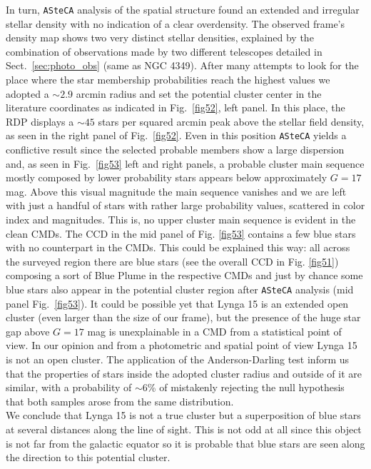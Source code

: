\documentclass[draft]{aa}
\begin{document}
In turn, \texttt{ASteCA} analysis of the spatial structure found an extended and
irregular stellar density with no indication of a clear overdensity.
The observed frame's density map shows two very distinct stellar
densities, explained by the combination of observations made by two different
telescopes detailed in Sect.~\ref{sec:photo_obs} (same as NGC 4349).
%
After many attempts to look for the place where the star membership
probabilities reach the highest values we adopted a $\sim2.9$ arcmin radius and
set the potential cluster center in the literature coordinates as indicated in
Fig.~\ref{fig52}, left panel. In this place, the RDP displays a $\sim45$ stars
per squared arcmin peak above the stellar field density, as seen in the right
panel of Fig.~\ref{fig52}.
%
Even in this position \texttt{ASteCA} yields a conflictive result
since the selected probable members show a large dispersion and, as
seen in Fig.~\ref{fig53} left and right panels, a probable cluster main
sequence mostly composed by lower probability stars appears below approximately
$G=17$ mag.
Above this visual magnitude the main sequence vanishes and we are left with
just a handful of stars with rather large probability values, scattered in
color index and magnitudes. This is, no upper cluster main sequence is
evident in the clean CMDs.
%
The CCD in the mid panel of Fig. \ref{fig53} contains a few blue stars with no
counterpart in the CMDs. This could be explained this way: all across the
surveyed region there are blue stars (see the overall CCD in Fig. \ref{fig51})
composing a sort of Blue Plume in the respective CMDs and just by chance some
blue stars also appear in the potential cluster region after \texttt{ASteCA}
analysis (mid panel Fig.~\ref{fig53}). It could be possible yet that Lynga 15
is an extended open cluster (even larger than the size of our frame), but the
presence of the huge star gap above $G=17$ mag is unexplainable in a CMD from a
statistical point of view.
%
In our opinion and from a photometric and spatial point of view Lynga 15 is not
an open cluster. The application of the Anderson-Darling test inform us that
the properties of stars inside the adopted cluster radius and outside of it are
similar, with a probability of $\sim$6\% of mistakenly rejecting the null
hypothesis that both samples arose from the same distribution.\\

We conclude that Lynga 15 is not a true cluster but a superposition of blue
stars at several distances along the line of sight.
This is not odd at all since this object is not far from the galactic equator
so it is probable that blue stars are seen along the direction to this
potential cluster.
\end{document}
